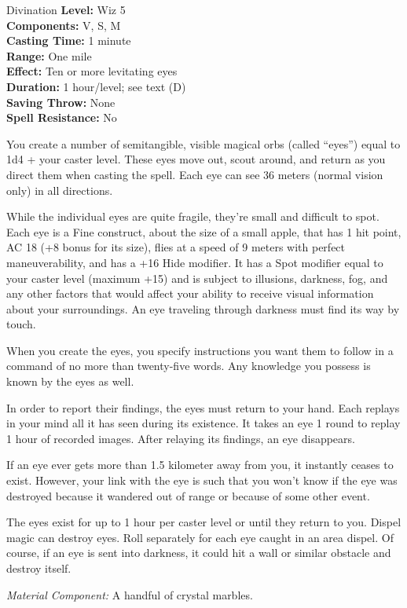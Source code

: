 {Divination}
{
	\textbf{Level:}
	Wiz 5\\
	\textbf{Components:}
	V, S, M\\
	\textbf{Casting Time:}
	1 minute\\
	\textbf{Range:}
	One mile\\
	\textbf{Effect:}
	Ten or more levitating eyes\\
	\textbf{Duration:}
	1 hour/level; see text (D)\\
	\textbf{Saving Throw:}
	None\\
	\textbf{Spell Resistance:}
	No\\
}
{
	You create a number of semitangible, visible magical orbs (called ``eyes'') equal to 1d4 + your caster level. These eyes move out, scout around, and return as you direct them when casting the spell. Each eye can see 36 meters (normal vision only) in all directions.

	While the individual eyes are quite fragile, they're small and difficult to spot. Each eye is a Fine construct, about the size of a small apple, that has 1 hit point, AC 18 (+8 bonus for its size), flies at a speed of 9 meters with perfect maneuverability, and has a +16 Hide modifier. It has a Spot modifier equal to your caster level (maximum +15) and is subject to illusions, darkness, fog, and any other factors that would affect your ability to receive visual information about your surroundings. An eye traveling through darkness must find its way by touch.

	When you create the eyes, you specify instructions you want them to follow in a command of no more than twenty-five words. Any knowledge you possess is known by the eyes as well.

	In order to report their findings, the eyes must return to your hand. Each replays in your mind all it has seen during its existence. It takes an eye 1 round to replay 1 hour of recorded images. After relaying its findings, an eye disappears.

	If an eye ever gets more than 1.5 kilometer away from you, it instantly ceases to exist. However, your link with the eye is such that you won't know if the eye was destroyed because it wandered out of range or because of some other event.

	The eyes exist for up to 1 hour per caster level or until they return to you. Dispel magic can destroy eyes. Roll separately for each eye caught in an area dispel. Of course, if an eye is sent into darkness, it could hit a wall or similar obstacle and destroy itself.

	\textit{Material Component:}
	A handful of crystal marbles.

}
